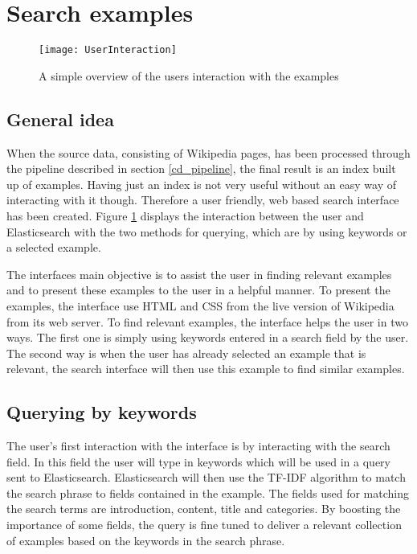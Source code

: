 \section{Search examples}
\begin{figure}[h]
\caption{A simple overview of the users interaction with the examples}
\texttt{[image: UserInteraction]}
\label{fig:ui}
\end{figure}

\subsection{General idea}
When the source data, consisting of Wikipedia pages, has been processed through the pipeline described in section \ref{cd_pipeline}, the final result is an index built up of examples. Having just an index is not very useful without an easy way of interacting with it though. Therefore a user friendly, web based search interface has been created. Figure \ref{fig:ui} displays the interaction between the user and Elasticsearch with the two methods for querying, which are by using keywords or a selected example.

The interfaces main objective is to assist the user in finding relevant examples and to present these examples to the user in a helpful manner. To present the examples, the interface use HTML and CSS from the live version of Wikipedia from its web server. To find relevant examples, the interface helps the user in two ways. The first one is simply using keywords entered in a search field by the user. The second way is when the user has already selected an example that is relevant, the search interface will then use this example to find similar examples.

\subsection{Querying by keywords}

The user's first interaction with the interface is by interacting with the search field. In this field the user will type in keywords which will be used in a query sent to Elasticsearch. Elasticsearch will then use the TF-IDF algorithm to match the search phrase to fields contained in the example. The fields used for matching the search terms are introduction, content, title and categories. By boosting the importance of some fields, the query is fine tuned to deliver a relevant collection of examples based on the keywords in the search phrase.


